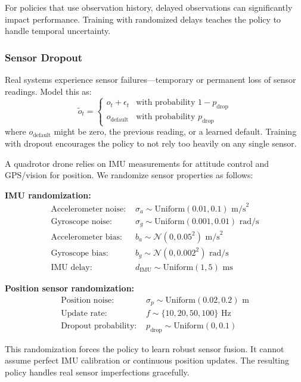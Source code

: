 For policies that use observation history, delayed observations can significantly impact performance. Training with randomized delays teaches the policy to handle temporal uncertainty.

\subsubsection{Sensor Dropout}

Real systems experience sensor failures---temporary or permanent loss of sensor readings. Model this as:
\begin{equation}
\tilde{o}_t = \begin{cases} o_t + \epsilon_t & \text{with probability } 1-p_{\text{drop}} \\ o_{\text{default}} & \text{with probability } p_{\text{drop}} \end{cases}
\end{equation}
where $o_{\text{default}}$ might be zero, the previous reading, or a learned default. Training with dropout encourages the policy to not rely too heavily on any single sensor.

\begin{example}
\label{ex:drone_sensor_rand}
A quadrotor drone relies on IMU measurements for attitude control and GPS/vision for position. We randomize sensor properties as follows:

\textbf{IMU randomization:}
\begin{align}
\text{Accelerometer noise: } &\sigma_a \sim \text{Uniform}(0.01, 0.1) \text{ m/s}^2 \\
\text{Gyroscope noise: } &\sigma_g \sim \text{Uniform}(0.001, 0.01) \text{ rad/s} \\
\text{Accelerometer bias: } &b_a \sim \mathcal{N}(0, 0.05^2) \text{ m/s}^2 \\
\text{Gyroscope bias: } &b_g \sim \mathcal{N}(0, 0.002^2) \text{ rad/s} \\
\text{IMU delay: } &d_{\text{IMU}} \sim \text{Uniform}(1, 5) \text{ ms}
\end{align}

\textbf{Position sensor randomization:}
\begin{align}
\text{Position noise: } &\sigma_p \sim \text{Uniform}(0.02, 0.2) \text{ m} \\
\text{Update rate: } &f \sim \{10, 20, 50, 100\} \text{ Hz} \\
\text{Dropout probability: } &p_{\text{drop}} \sim \text{Uniform}(0, 0.1)
\end{align}

This randomization forces the policy to learn robust sensor fusion. It cannot assume perfect IMU calibration or continuous position updates. The resulting policy handles real sensor imperfections gracefully.
\end{example}


